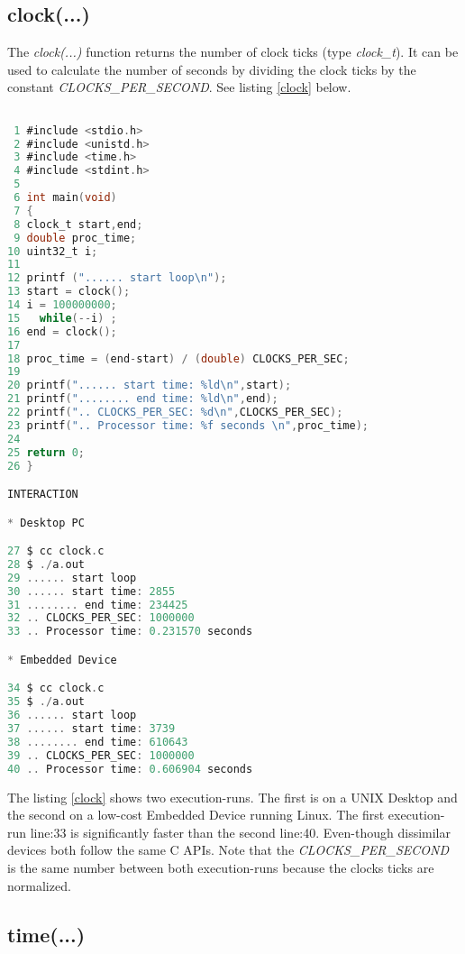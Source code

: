   

\subsection{clock(...)} \label{clockss} 

The \textit{clock(...)} function returns the number of clock ticks (type \textit{clock\_t}). It can be used to calculate the number of seconds by dividing the clock ticks by the constant  \textit{CLOCKS\_PER\_SECOND}. See listing \ref{clock} below.
 
\begin{lstlisting}[language=C,showstringspaces=false,caption={File: clock.c},captionpos=b,label=clock]

 1 #include <stdio.h>
 2 #include <unistd.h>
 3 #include <time.h>
 4 #include <stdint.h>
 5 
 6 int main(void)
 7 {
 8 clock_t start,end;
 9 double proc_time;
10 uint32_t i;
11 
12 printf ("...... start loop\n");
13 start = clock();
14 i = 100000000;
15   while(--i) ;
16 end = clock();
17 
18 proc_time = (end-start) / (double) CLOCKS_PER_SEC;
19 
20 printf("...... start time: %ld\n",start);
21 printf("........ end time: %ld\n",end);
22 printf(".. CLOCKS_PER_SEC: %d\n",CLOCKS_PER_SEC);
23 printf(".. Processor time: %f seconds \n",proc_time);
24 
25 return 0;
26 }

INTERACTION

* Desktop PC

27 $ cc clock.c
28 $ ./a.out
29 ...... start loop
30 ...... start time: 2855
31 ........ end time: 234425
32 .. CLOCKS_PER_SEC: 1000000
33 .. Processor time: 0.231570 seconds

* Embedded Device 

34 $ cc clock.c
35 $ ./a.out
36 ...... start loop
37 ...... start time: 3739
38 ........ end time: 610643
39 .. CLOCKS_PER_SEC: 1000000
40 .. Processor time: 0.606904 seconds 

\end{lstlisting}

The listing \ref{clock} shows two execution-runs. The first is on a UNIX Desktop and the second on a low-cost Embedded Device running Linux. The first execution-run line:33 is significantly faster than the second line:40. Even-though dissimilar devices both follow the same C APIs. Note that the \textit{CLOCKS\_PER\_SECOND} is the same number between both execution-runs because the clocks ticks are normalized.   

\subsection{time(...)} \label{timet} 

